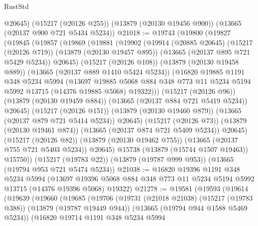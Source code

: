 \begin{lexlean}{RustStd}
\begin{coremodule}
      @20645)
    (@15217 (@20126 @255))
    (@13879 (@20130 @19456 @900))
    (@13665 (@20137 @900 @721 @5434 @5234))
@21018 := @19743
    (@19800
      (@19827
        (@19845
          (@19857
            (@19869
              (@19881
                (@19902
                  (@19914
                    (@20885 @20645)
                    (@15217 (@20126 @719))
                    (@13879 (@20130 @19457 @895))
                    (@13665 (@20137 @895 @721 @5429 @5234))
                    @20645)
                  (@15217 (@20126 @108))
                  (@13879 (@20130 @19458 @889))
                  (@13665 (@20137 @889 @1410 @5424 @5234))
                  (@16820
                    @19885
                    @1191
                    @348
                    @5234
                    @5994
                    (@13697
                      @19885
                      @5068
                      @884
                      @348
                      @773
                      @11
                      @5234
                      @5194
                      @5992
                      @13715
                      (@14376 @19885 @5068)
                      @19322)))
                (@15217 (@20126 @96))
                (@13879 (@20130 @19459 @884))
                (@13665 (@20137 @884 @721 @5419 @5234))
                @20645)
              (@15217 (@20126 @151))
              (@13879 (@20130 @19460 @879))
              (@13665 (@20137 @879 @721 @5414 @5234))
              @20645)
            (@15217 (@20126 @73))
            (@13879 (@20130 @19461 @874))
            (@13665 (@20137 @874 @721 @5409 @5234))
            @20645)
          (@15217 (@20126 @82))
          (@13879 (@20130 @19462 @755))
          (@13665 (@20137 @755 @721 @5403 @5234))
          @20645)
        @15738
        (@13879 (@15744 @1507 @19463))
        @15750))
    (@15217 (@19783 @22))
    (@13879 (@19787 @999 @953))
    (@13665 (@19794 @953 @721 @5474 @5234))
@21038 := @16820
    @19396
    @1191
    @348
    @5234
    @5994
    (@13697 @19396 @5068 @884 @348 @773 @11 @5234 @5194 @5992 @13715 (@14376 @19396 @5068) @19322)
@21278 := @19581
    (@19593
      (@19614
        (@19639
          (@19660
            (@19685
              (@19706
                (@19731
                  (@21018 @21038)
                  (@15217 (@19783 @388))
                  (@13879 (@19787 @19449 @944))
                  (@13665 (@19794 @944 @1588 @5469 @5234))
                  (@16820
                    @19714
                    @1191
                    @348
                    @5234
                    @5994

\end{coremodule}
\end{lexlean}

